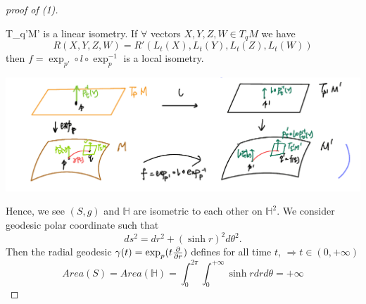 \begin{proof}[proof of (1)]
\begin{itemize}
        T_{q'}M'\) is a linear isometry. If \(\forall\) vectors 
        \(X, Y,Z,W\in T_q M\) we have
        \[
            R(X,Y,Z,W)=R'(L_t(X),L_t(Y),L_t(Z),L_t(W))    
        \]
        then \(f=\exp_{p'}\circ l\circ \exp_p^{-1}\) is a local isometry.
        \begin{center}
            \includegraphics[scale=0.4]{picture/week15/cartan theorem.png}
        \end{center}
    \end{itemize}
    Hence, we see \((S,g)\) and \(\mathbb{H}\) are isometric to each other on
    \(\mathbb{H}^2\). We consider geodesic polar coordinate such that
    \[ds^2=dr^2+\left(\sinh r\right)^2 d\theta^2.\]
    Then the radial geodesic \(\gamma(t)=\exp_p(t\pdv{r})\) defines for all
    time \(t\), \(\Rightarrow t\in (0,+\infty)\)
    \[Area(S)=Area(\mathbb{H})=\int_{0}^{2\pi} \int_{0}^{+\infty}
    \sinh r drd\theta=+\infty\]
\end{proof}
